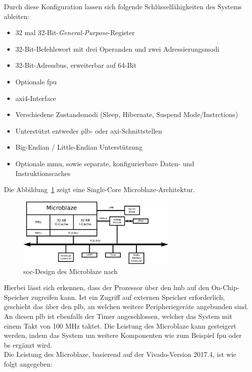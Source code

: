 Durch diese Konfiguration lassen sich folgende Schlüsselfähigkeiten des Systems ableiten:\\
\begin{itemize}
  \item 32 mal 32-Bit-\emph{General-Purpose}-Register
  \item 32-Bit-Befehlswort mit drei Operanden und zwei Adressierungsmodi
  \item 32-Bit-Adressbus, erweiterbar auf 64-Bit
  \item Optionale \ac{fpu}
  \item \ac{axi}4-Interface
  \item Verschiedene Zustandsmodi (Sleep, Hibernate, Suspend Mode/Instrctions)
  \item Unterstützt entweder \ac{plb}- oder \ac{axi}-Schnittstellen
  \item Big-Endian / Little-Endian Unterstützung
  \item Optionale \ac{mmu}, sowie separate, konfigurierbare Daten- und Instruktionscaches
\end{itemize}

Die Abbildung~\ref{fig:microblaze} zeigt eine Single-Core Microblaze-Architektur.

\begin{figure}[H]
\centering
\includegraphics[width=0.7\textwidth]{Hauptteil/microblaze.eps}
\caption{\ac{soc}-Design des Microblaze nach~\cite{comparison}}
\label{fig:microblaze}
\end{figure}

Hierbei lässt sich erkennen, dass der Prozessor über den \ac{lmb} auf den On-Chip-Speicher zugreifen kann. Ist ein Zugriff auf externen Speicher erforderlich,
geschieht das über den \ac{plb}, an welchen weitere Peripheriegeräte angebunden sind. An diesen \ac{plb} ist ebenfalls der Timer angeschlossen, welcher das System mit einem Takt von
100 MHz taktet. Die Leistung des Microblaze kann gesteigert werden, indem das System um weitere Komponenten wie zum Beispiel \ac{fpu} oder \ac{bs} ergänzt wird.\\
Die Leistung des Microblaze, basierend auf der Vivado-Version 2017.4, ist wie folgt angegeben:~\cite{microblaze}\\

